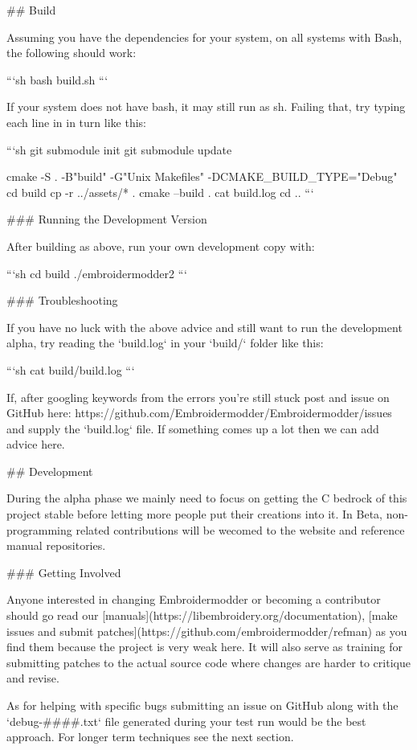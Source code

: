 ## Build

Assuming you have the dependencies for your system, on all systems with Bash, the following should work:

```sh
bash build.sh
```

If your system does not have bash, it may still run as sh.
Failing that, try typing each line in in turn like this:

```sh
git submodule init
git submodule update

cmake -S . -B"build" -G"Unix Makefiles" -DCMAKE_BUILD_TYPE="Debug"
cd build
cp -r ../assets/* .
cmake --build .
cat build.log
cd ..
```

### Running the Development Version

After building as above, run your own development copy with:

```sh
cd build
./embroidermodder2
```

### Troubleshooting

If you have no luck with the above advice and still want to
run the development alpha, try reading the `build.log` in your
`build/` folder like this:

```sh
cat build/build.log
```

If, after googling keywords from the errors you're still stuck
post and issue on GitHub here: https://github.com/Embroidermodder/Embroidermodder/issues and supply the `build.log` file. If something
comes up a lot then we can add advice here.

## Development

During the alpha phase we mainly need to focus on getting the C bedrock of this project stable before letting more people
put their creations into it. In Beta, non-programming related contributions will be wecomed to the website and reference manual
repositories.

### Getting Involved

Anyone interested in changing Embroidermodder or becoming a contributor should go read our
[manuals](https://libembroidery.org/documentation), [make issues and submit patches](https://github.com/embroidermodder/refman)
as you find them because the project is very weak here. It will also serve as training for submitting patches to the actual
source code where changes are harder to critique and revise.

As for helping with specific bugs submitting an issue on GitHub along with the `debug-####.txt` file generated during
your test run would be the best approach. For longer term techniques see the next section.

